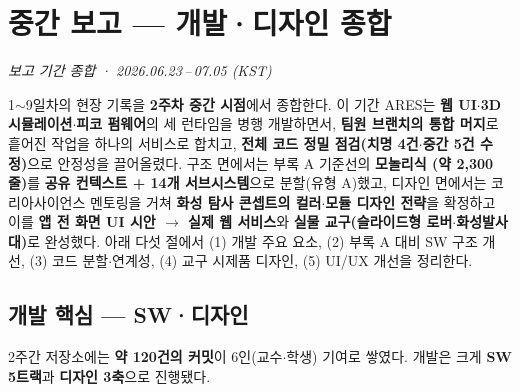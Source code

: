 \chapter{중간 보고 — 개발·디자인 종합}
\textit{보고 기간 종합 · 2026.06.23\,--\,07.05 (KST)}

\begin{summarybox}
1$\sim$9일차의 현장 기록을 \textbf{2주차 중간 시점}에서 종합한다. 이 기간 ARES는
\textbf{웹 UI$\cdot$3D 시뮬레이션$\cdot$피코 펌웨어}의 세 런타임을 병행 개발하면서,
\textbf{팀원 브랜치의  통합 머지}로 흩어진 작업을 하나의 서비스로 합치고,
\textbf{전체 코드 정밀 점검(치명 4건$\cdot$중간 5건 수정)}으로 안정성을 끌어올렸다.
구조 면에서는 부록 A 기준선의 \textbf{모놀리식 (약 2{,}300줄)}를
\textbf{공유 컨텍스트 + 14개 서브시스템}으로 분할(유형 A)했고, 디자인 면에서는
코리아사이언스 멘토링을 거쳐 \textbf{화성 탐사 콘셉트의 컬러$\cdot$모듈 디자인 전략}을
확정하고 이를 \textbf{앱 전 화면 UI 시안 $\to$ 실제 웹 서비스}와 \textbf{실물 교구(슬라이드형
로버$\cdot$화성발사대)}로 완성했다. 아래 다섯 절에서 (1) 개발 주요 요소, (2) 부록 A 대비 SW
구조 개선, (3) 코드 분할$\cdot$연계성, (4) 교구 시제품 디자인, (5) UI/UX 개선을 정리한다.
\end{summarybox}

\smallskip
{}

\section{개발 핵심 --- SW·디자인}
2주간 저장소에는 \textbf{약 120건의 커밋}이 6인(교수$\cdot$학생) 기여로 쌓였다. 개발은 크게
\textbf{SW 5트랙}과 \textbf{디자인 3축}으로 진행됐다.

